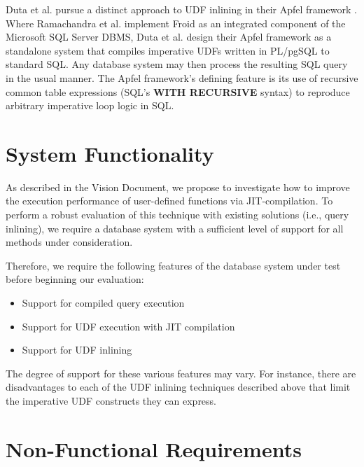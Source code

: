 \documentclass{vldb}
\newcommand{\dbCode}[1]{{\sffamily\small \textbf{#1}}\xspace}
\begin{document}
Duta et al. pursue a distinct approach to UDF inlining in their Apfel framework \cite{apfel}. Where Ramachandra et al. implement Froid as an integrated component of the Microsoft SQL Server DBMS, Duta et al. design their Apfel framework as a standalone system that compiles imperative UDFs written in PL/pgSQL \cite{plpgsql} to standard SQL. Any database system may then process the resulting SQL query in the usual manner. The Apfel framework's defining feature is its use of recursive common table expressions (SQL's \dbCode{WITH RECURSIVE} syntax) to reproduce arbitrary imperative loop logic in SQL.


\section{System Functionality}

As described in the Vision Document, we propose to investigate how to improve the execution performance of user-defined functions via JIT-compilation. To perform a robust evaluation of this technique with existing solutions (i.e., query inlining), we require a database system with a sufficient level of support for all methods under consideration.

Therefore, we require the following features of the database system under test before beginning our evaluation: 

\begin{itemize}
    \item Support for compiled query execution
    \item Support for UDF execution with JIT compilation 
    \item Support for UDF inlining 
\end{itemize}

The degree of support for these various features may vary. For instance, there are disadvantages to each of the UDF inlining techniques described above that limit the imperative UDF constructs they can express.


\section{Non-Functional Requirements}
\end{document}
